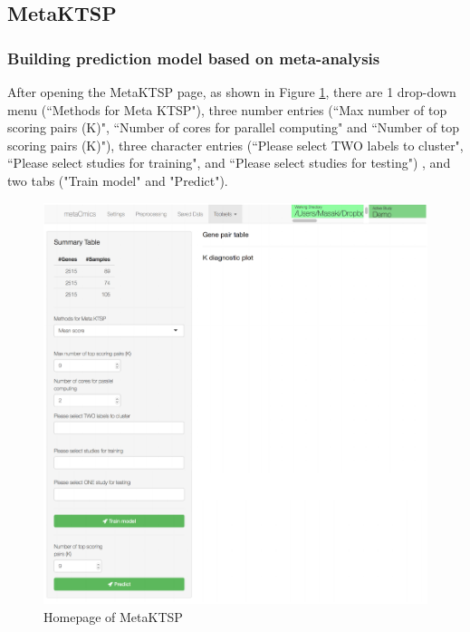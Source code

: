 \subsection{MetaKTSP}
\subsubsection{Building prediction model based on meta-analysis}

After opening the MetaKTSP page, as shown in Figure \ref{fig:MetaKTSPmainpage}, there are 1 drop-down menu (``Methods for Meta KTSP"), three number entries (``Max number of top scoring pairs (K)", ``Number of cores for parallel computing" and ``Number of top scoring pairs (K)"), three character entries (``Please select TWO labels to cluster", ``Please select studies for training", and ``Please select studies for testing") , and two tabs ("Train model" and "Predict"). 

\begin{figure}[H]
\begin{center}
\includegraphics[scale=0.7]{./figure/MetaKTSP/Figure4.pdf}
\caption{Homepage of MetaKTSP}
\label{fig:MetaKTSPmainpage}
\end{center}
\end{figure}

